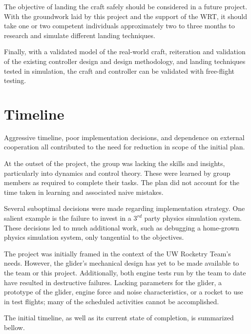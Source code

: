\documentclass{sydeStyle}
\begin{document}
The objective of landing the craft safely should be considered in a future
project.  With the groundwork laid by this project and the support of the WRT,
it should take one or two competent individuals approximately two to three
months to research and simulate different landing techniques.

Finally, with a validated model of the real-world craft, reiteration and
validation of the existing controller design and design methodology, and landing
techniques tested in simulation, the craft and controller can be validated with
free-flight testing.

\appendix

\chapter{Timeline}


Aggressive timeline, poor implementation decisions, and dependence on external
cooperation all contributed to the need for reduction in scope of the initial
plan.

At the outset of the project, the group was lacking the skills and insights,
particularly into dynamics and control theory. These were learned by group
members as required to complete their tasks. The plan did not account for the
time taken in learning and associated naive mistakes.

Several suboptimal decisions were made regarding implementation strategy. One
salient example is the failure to invest in a $3^{rd}$ party physics simulation
system. These decisions led to much additional work, such as debugging a
home-grown physics simulation system, only tangential to the objectives.

The project was initially framed in the context of the UW Rocketry Team's needs.
However, the glider's mechanical design has yet to be made available to the team or
this project. Additionally, both engine tests run by the team to date have
resulted in destructive failures. Lacking parameters for the glider, a prototype
of the glider, engine force and noise characteristics, or a rocket to use in
test flights; many of the scheduled activities cannot be accomplished.

The initial timeline, as well as its current state of completion, is summarized
bellow.
\end{document}
